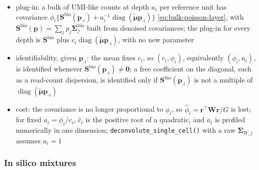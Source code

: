 \documentclass[pdflatex, sn-nature]{sn-jnl}
\theoremstyle{thmstyleone}%
\theoremstyle{thmstyletwo}%
\theoremstyle{thmstylethree}%
\begin{document}
\begin{itemize}
  \item plug-in: a bulk of UMI-like counts at depth \(a_{i}\) per reference unit has covariance
        \(\phi_{i}\{\boldsymbol{S}^{\mathrm{bio}}(\boldsymbol{p}_{\cdot i})+a_{i}^{-1}\operatorname{diag}(\tilde{\boldsymbol{\mu}}\boldsymbol{p}_{\cdot i})\}\)
        \eqref{eq:bulk-poisson-layer}, with \(\boldsymbol{S}^{\mathrm{bio}}(\boldsymbol{p})=\sum_{j}p_{j}\boldsymbol{\Sigma}^{\mathrm{bio}}_{j}\) built
        from denoised covariances; the plug-in for every depth is \(\boldsymbol{S}^{\mathrm{bio}}\) plus
        \(c_{i}\operatorname{diag}(\tilde{\boldsymbol{\mu}}\boldsymbol{p}_{\cdot i})\), with no new parameter
  \item identifiability, given \(\boldsymbol{p}_{\cdot i}\): the mean fixes \(c_{i}\), so \((c_{i},\phi_{i})\), equivalently
        \((\phi_{i},a_{i})\), is identified whenever \(\boldsymbol{S}^{\mathrm{bio}}(\boldsymbol{p}_{\cdot i})\neq\boldsymbol{0}\); a free
        coefficient on the diagonal, such as a read-count dispersion, is identified only if
        \(\boldsymbol{S}^{\mathrm{bio}}(\boldsymbol{p}_{\cdot i})\) is not a multiple of \(\operatorname{diag}(\tilde{\boldsymbol{\mu}}\boldsymbol{p}_{\cdot i})\)
  \item cost: the covariance is no longer proportional to \(\phi_{i}\), so \(\hat\phi_{i}=\boldsymbol{r}^{\top}\boldsymbol{W}\boldsymbol{r}/G\) is
        lost; for fixed \(a_{i}=\phi_{i}/c_{i}\), \(\hat c_{i}\) is the positive root of a quadratic, and \(a_{i}\) is
        profiled numerically in one dimension; \texttt{deconvolute\_single\_cell()} with a raw
        \(\boldsymbol{\Sigma}_{W,j}\) assumes \(a_{i}=1\)
\end{itemize}


\subsubsection{In silico mixtures}
\label{sec:sc-synthetic}
\end{document}
